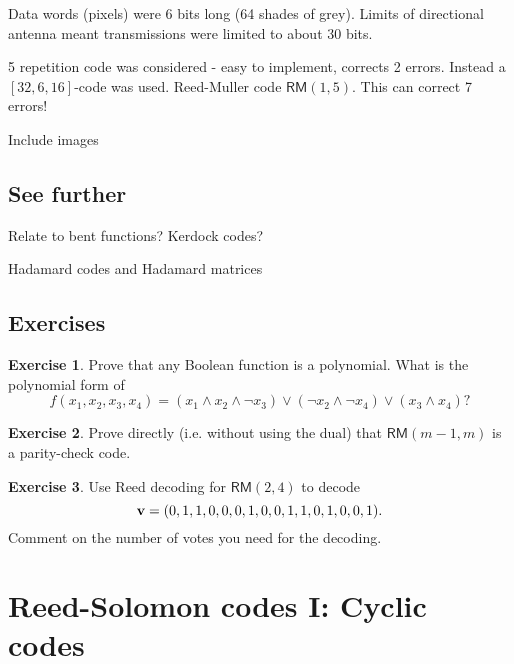 \documentclass[a4paper, 11pt, openany]{book}
\numberwithin{equation}{section}
\theoremstyle{plain}
\theoremstyle{definition}
\newtheorem{exercise}   {Exercise}  [section]
\newcommand{\code}[1]{\mathsf{#1}}
\newcommand{\ReedMuller}            {\code{RM}}
\begin{document}
Data words (pixels) were 6 
bits long (64 shades of grey). 
Limits of directional antenna 
meant transmissions were 
limited to about 30 bits.

5 repetition code was 
considered - easy to 
implement, corrects 2 errors.
Instead a $[32, 6, 16]$-code 
was used. Reed-Muller code $\ReedMuller(1,5)$.
This can correct 7 errors!

Include images



\subsection{See further}

Relate to bent functions? Kerdock codes?

Hadamard codes and Hadamard matrices



\subsection{Exercises}

\begin{exercise}
Prove that any Boolean function is a polynomial. What is the polynomial form of 
\[
	f(x_1, x_2, x_3, x_4) = (x_1 \land x_2 \land \neg x_3) \lor (\neg x_2 \land \neg x_4) \lor (x_3 \land x_4)?
\]
\end{exercise}



\begin{exercise}
Prove directly (i.e. without using the dual) that $\ReedMuller(m-1,m)$ is a parity-check code.
\end{exercise}


\begin{exercise}
Use Reed decoding for $\ReedMuller(2,4)$ to decode
\[
	{\bf v} = (0,1,1,0,0,0,1,0,0,1,1,0,1,0,0,1).
\]
Comment on the number of votes you need for the decoding.
\end{exercise}












\section{Reed-Solomon codes I: Cyclic codes}
\label{sec:26}
\end{document}
